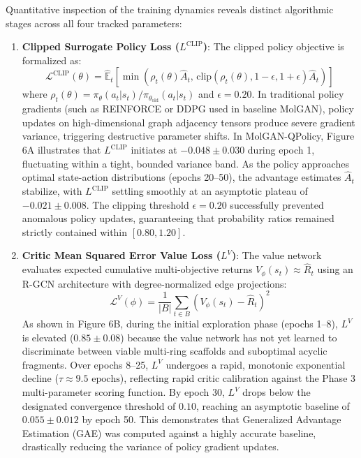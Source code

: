 \documentclass[10pt,a4paper]{article}
\begin{document}
Quantitative inspection of the training dynamics reveals distinct algorithmic stages across all four tracked parameters:

\begin{enumerate}[leftmargin=*]
    \item \textbf{Clipped Surrogate Policy Loss ($L^{\text{CLIP}}$)}: 
    The clipped policy objective is formalized as:
    \begin{equation}
    \mathcal{L}^{\text{CLIP}}(\theta) = \hat{\mathbb{E}}_t \left[ \min\left( \rho_t(\theta) \hat{A}_t, \, \text{clip}(\rho_t(\theta), 1-\epsilon, 1+\epsilon) \hat{A}_t \right) \right]
    \end{equation}
    where $\rho_t(\theta) = \pi_\theta(a_t | s_t) / \pi_{\theta_{\text{old}}}(a_t | s_t)$ and $\epsilon = 0.20$. In traditional policy gradients (such as REINFORCE or DDPG used in baseline MolGAN), policy updates on high-dimensional graph adjacency tensors produce severe gradient variance, triggering destructive parameter shifts. In MolGAN-QPolicy, Figure 6A illustrates that $L^{\text{CLIP}}$ initiates at $-0.048 \pm 0.030$ during epoch 1, fluctuating within a tight, bounded variance band. As the policy approaches optimal state-action distributions (epochs 20--50), the advantage estimates $\hat{A}_t$ stabilize, with $L^{\text{CLIP}}$ settling smoothly at an asymptotic plateau of $-0.021 \pm 0.008$. The clipping threshold $\epsilon = 0.20$ successfully prevented anomalous policy updates, guaranteeing that probability ratios remained strictly contained within $[0.80, 1.20]$.

    \item \textbf{Critic Mean Squared Error Value Loss ($L^V$)}:
    The value network evaluates expected cumulative multi-objective returns $V_\phi(s_t) \approx \hat{R}_t$ using an R-GCN architecture with degree-normalized edge projections:
    \begin{equation}
    \mathcal{L}^V(\phi) = \frac{1}{|B|} \sum_{t \in B} \left( V_\phi(s_t) - \hat{R}_t \right)^2
    \end{equation}
    As shown in Figure 6B, during the initial exploration phase (epochs 1--8), $L^V$ is elevated ($0.85 \pm 0.08$) because the value network has not yet learned to discriminate between viable multi-ring scaffolds and suboptimal acyclic fragments. Over epochs 8--25, $L^V$ undergoes a rapid, monotonic exponential decline ($\tau \approx 9.5\text{ epochs}$), reflecting rapid critic calibration against the Phase 3 multi-parameter scoring function. By epoch 30, $L^V$ drops below the designated convergence threshold of $0.10$, reaching an asymptotic baseline of $0.055 \pm 0.012$ by epoch 50. This demonstrates that Generalized Advantage Estimation (GAE) was computed against a highly accurate baseline, drastically reducing the variance of policy gradient updates.


\end{enumerate}
\end{document}
